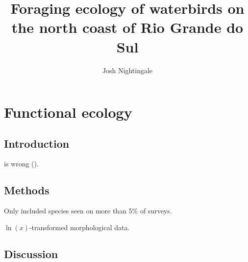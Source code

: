 \documentclass[12pt,a4paper,draft]{book}
\author{Josh Nightingale}
\title{Foraging ecology of waterbirds on the north coast of Rio Grande do Sul}
\begin{document}
\maketitle

\tableofcontents

\chapter{Functional ecology}

\section{Introduction}

\cite{Yoon2002} is wrong (\cite{Smith2009a}).

\newpage
\section{Methods}

Only included species seen on more than 5\% of surveys.

$\ln(x)$-transformed morphological data.



\section{Discussion}

\printbibliography
\end{document}
